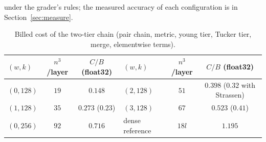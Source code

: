 under the grader's rules; the measured accuracy of each configuration is in Section~\ref{sec:measure}.
\begin{table}[h]\centering\small
\begin{tabular}{lcc|lcc}\toprule
$(w,k)$ & $n^3$/layer & $C/B$ (float32) & $(w,k)$ & $n^3$/layer & $C/B$ (float32)\\\midrule
$(0,128)$ & $19$ & $0.148$ & $(2,128)$ & $51$ & $0.398$ ($0.32$ with Strassen)\\
$(1,128)$ & $35$ & $0.273$ ($0.23$) & $(3,128)$ & $67$ & $0.523$ ($0.41$)\\
$(0,256)$ & $92$ & $0.716$ & dense reference & $18l$ & $1.195$\\
\bottomrule\end{tabular}
\caption{Billed cost of the two-tier chain (pair chain, metric, young tier, Tucker tier, merge, elementwise terms).}
\label{tab:tier-cost}
\end{table}

